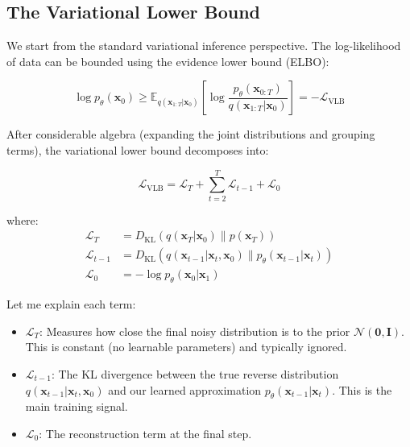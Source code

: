 \subsection{The Variational Lower Bound}
\label{subsec:vlb}

We start from the standard variational inference perspective. The log-likelihood of data can be bounded using the evidence lower bound (ELBO):

\begin{equation}
\log p_\theta(\mathbf{x}_0) \geq \mathbb{E}_{q(\mathbf{x}_{1:T}|\mathbf{x}_0)}\left[\log \frac{p_\theta(\mathbf{x}_{0:T})}{q(\mathbf{x}_{1:T}|\mathbf{x}_0)}\right] = -\mathcal{L}_{\text{VLB}}
\label{eq:elbo}
\end{equation}

After considerable algebra (expanding the joint distributions and grouping terms), the variational lower bound decomposes into:

\begin{equation}
\mathcal{L}_{\text{VLB}} = \mathcal{L}_T + \sum_{t=2}^{T} \mathcal{L}_{t-1} + \mathcal{L}_0
\label{eq:vlb_decomposition}
\end{equation}

where:
\begin{align}
\mathcal{L}_T &= D_{\text{KL}}\left(q(\mathbf{x}_T | \mathbf{x}_0) \| p(\mathbf{x}_T)\right) \label{eq:L_T} \\
\mathcal{L}_{t-1} &= D_{\text{KL}}\left(q(\mathbf{x}_{t-1} | \mathbf{x}_t, \mathbf{x}_0) \| p_\theta(\mathbf{x}_{t-1} | \mathbf{x}_t)\right) \label{eq:L_t} \\
\mathcal{L}_0 &= -\log p_\theta(\mathbf{x}_0 | \mathbf{x}_1) \label{eq:L_0}
\end{align}

Let me explain each term:

\begin{itemize}
    \item $\mathcal{L}_T$: Measures how close the final noisy distribution is to the prior $\mathcal{N}(\mathbf{0}, \mathbf{I})$. This is constant (no learnable parameters) and typically ignored.

    \item $\mathcal{L}_{t-1}$: The KL divergence between the true reverse distribution $q(\mathbf{x}_{t-1} | \mathbf{x}_t, \mathbf{x}_0)$ and our learned approximation $p_\theta(\mathbf{x}_{t-1} | \mathbf{x}_t)$. This is the main training signal.

    \item $\mathcal{L}_0$: The reconstruction term at the final step.
\end{itemize}

